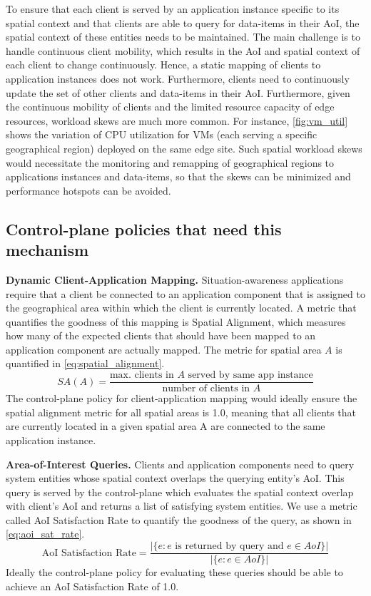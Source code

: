 \par To ensure that each client is served by an application instance specific to its spatial context and that clients are able to query for data-items in their AoI, the spatial context of these entities needs to be maintained. The main challenge is to handle continuous client mobility, which results in the AoI and spatial context of each client to change continuously. Hence, a static mapping of clients to application instances does not work. Furthermore, clients need to continuously update the set of other clients and data-items in their AoI. Furthermore, given the continuous mobility of clients and the limited resource capacity of edge resources, workload skews are much more common. For instance, \cref{fig:vm_util} shows the variation of CPU utilization for VMs (each serving a specific geographical region) deployed on the same edge site. Such spatial workload skews would necessitate the monitoring and remapping of geographical regions to applications instances and data-items, so that the skews can be minimized and performance hotspots can be avoided.

\subsection{Control-plane policies that need this mechanism}
\par \textbf{Dynamic Client-Application Mapping. } Situation-awareness applications require that a client be connected to an application component that is assigned to the geographical area within which the client is currently located. A metric that quantifies the goodness of this mapping is Spatial Alignment, which measures how many of the expected clients that should have been mapped to an application component are actually mapped. The metric for spatial area $A$ is quantified in \cref{eq:spatial_alignment}.
\begin{equation}
SA \left( A \right) = \dfrac{\text{max. clients in }A\text{ served by same app instance}}{\text{number of clients in }A}
\label{eq:spatial_alignment}
\end{equation}
The control-plane policy for client-application mapping would ideally ensure the spatial alignment metric for all spatial areas is 1.0, meaning that all clients that are currently located in a given spatial area A are connected to the same application instance.

\par \textbf{Area-of-Interest Queries. } Clients and application components need to query system entities whose spatial context overlaps the querying entity's AoI. This query is served by the control-plane which evaluates the spatial context overlap with client's AoI and returns a list of satisfying system entities. We use a metric called AoI Satisfaction Rate to quantify the goodness of the query, as shown in \cref{eq:aoi_sat_rate}.
\begin{equation}
\text{AoI Satisfaction Rate} = \dfrac{|\{ e: e \text{ is returned by query  and } e \in AoI \}|}{|\{ e: e \in AoI \}|}
\label{eq:aoi_sat_rate}
\end{equation}
Ideally the control-plane policy for evaluating these queries should be able to achieve an AoI Satisfaction Rate of 1.0.
